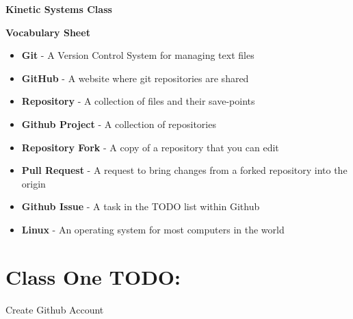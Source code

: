 \documentclass{article}
\begin{document}
	
{\huge \textbf{Kinetic Systems Class}}

\vspace{1cm}

{\huge \textbf{Vocabulary Sheet}}

\begin{itemize}
  \item \textbf{Git} - A Version Control System for managing text files
  \item \textbf{GitHub} - A website where git repositories are shared
  \item \textbf{Repository} - A collection of files and their save-points
  \item \textbf{Github Project} - A collection of repositories 
  \item \textbf{Repository Fork} - A copy of a repository that you can edit
  \item \textbf{Pull Request} - A request to bring changes from a forked repository into the origin
  \item \textbf{Github Issue} - A task in the TODO list within Github
  \item \textbf{Linux }- An operating system for most computers in the world
\end{itemize}

\newpage

\section{Class One TODO:}
\begin{todolist}
	\item Create Github Account
\end{todolist}
\end{document}
